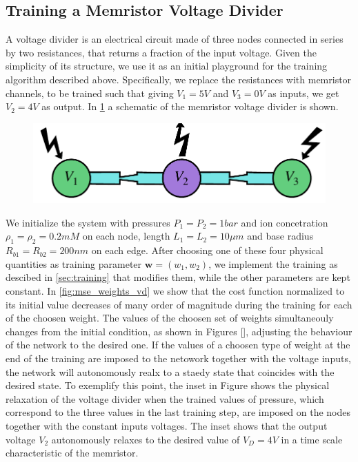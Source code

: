 \documentclass[reprint,superscriptaddress,prb,showkeys]{revtex4-2}
\newcommand{\brac}[1]{\left(#1 \right)} %
\begin{document}
\subsection{Training a Memristor Voltage Divider}

A voltage divider is an electrical circuit made of three nodes connected in series by two resistances, that returns a fraction of the input voltage. Given the simplicity of its structure, we use it as an initial playground for the training algorithm described above. Specifically, we replace the resistances with memristor channels, to be trained such that giving $V_1 = 5V$ and $V_3 = 0V$ as inputs, we get $V_2 = 4V$ as output. In \cref{fig:vd_scheme} a schematic of the memristor voltage divider is shown.

\begin{figure}[h]
    \centering
    \includegraphics[width=0.8\columnwidth]{plots/voltage_divider/vd_scheme.pdf}
    \caption{}\label{fig:vd_scheme}
\end{figure} 

We initialize the system with pressures $P_1 =  P_2 = 1 bar$ and ion concetration $\rho_1 = \rho_2 = 0.2 mM$ on each node, length $L_1 = L_2 = 10\mu m$ and base radius  $R_{b1} = R_{b2} = 200 nm$ on each edge. After choosing one of these four physical quantities as training parameter $\boldsymbol{w} = \brac{w_1, w_2}$, we implement the training as descibed in \cref{sec:training} that modifies them, while the other parameters are kept constant. 
In \cref{fig:mse_weights_vd} we show that the cost function normalized to its initial value decreases of many order of magnitude during the training for each of the choosen weight. The values of the choosen set of weights simultaneouly changes from the initial condition, as shown in Figures [], adjusting the behaviour of the network to the desired one. If the values of a choosen type of weight at the end of the training are imposed to the netowork together with the voltage inputs, the network will autonomously realx to a staedy state that coincides with the desired state. To exemplify this point, the inset in Figure shows the physical relaxation of the voltage divider when the trained values of pressure, which correspond to the three values in the last training step, are imposed on the nodes together with the constant inputs voltages. The inset shows that the output voltage $V_2$ autonomously relaxes to the desired value of $V_D=4V$ in a time scale characteristic of the memristor.
\end{document}
